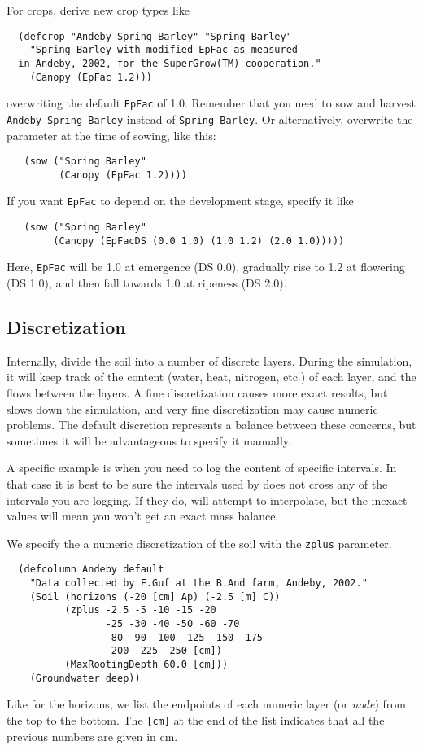 \documentclass[a4paper,11pt]{article}
\begin{document}
For crops, derive new crop types like
\begin{verbatim}
  (defcrop "Andeby Spring Barley" "Spring Barley"
    "Spring Barley with modified EpFac as measured
  in Andeby, 2002, for the SuperGrow(TM) cooperation."
    (Canopy (EpFac 1.2)))
\end{verbatim}
overwriting the default \texttt{EpFac} of 1.0.  Remember that you need
to sow and harvest \texttt{Andeby Spring Barley} instead of
\texttt{Spring Barley}.  Or alternatively, overwrite the parameter at
the time of sowing, like this:
\begin{verbatim}
   (sow ("Spring Barley"
         (Canopy (EpFac 1.2))))
\end{verbatim}
If you want \texttt{EpFac} to depend on the development stage, specify
it like
\begin{verbatim}
   (sow ("Spring Barley"
        (Canopy (EpFacDS (0.0 1.0) (1.0 1.2) (2.0 1.0)))))
\end{verbatim}
Here, \texttt{EpFac} will be 1.0 at emergence (DS 0.0), gradually rise
to 1.2 at flowering (DS 1.0), and then fall towards 1.0 at ripeness (DS
2.0).

\subsection{Discretization}

Internally, \daisy{} divide the soil into a number of discrete layers.
During the simulation, it will keep track of the content (water, heat,
nitrogen, etc.) of each layer, and the flows between the layers.  A
fine discretization causes more exact results, but slows down the
simulation, and very fine discretization may cause numeric problems.
The default discretion represents a balance between these concerns,
but sometimes it will be advantageous to specify it manually.

A specific example is when you need to log the content of specific
intervals.  In that case it is best to be sure the intervals used by
\daisy{} does not cross any of the intervals you are logging.  If they
do, \daisy{} will attempt to interpolate, but the inexact values will
mean you won't get an exact mass balance.

We specify the a numeric discretization of the soil with the
\texttt{zplus} parameter.  
\begin{verbatim}
  (defcolumn Andeby default
    "Data collected by F.Guf at the B.And farm, Andeby, 2002."
    (Soil (horizons (-20 [cm] Ap) (-2.5 [m] C))
          (zplus -2.5 -5 -10 -15 -20
                 -25 -30 -40 -50 -60 -70
                 -80 -90 -100 -125 -150 -175
                 -200 -225 -250 [cm])
          (MaxRootingDepth 60.0 [cm]))
    (Groundwater deep))
\end{verbatim}
Like for the horizons, we list the endpoints of each numeric layer (or
\emph{node}) from the top to the bottom.  The \verb|[cm]| at the end
of the list indicates that all the previous numbers are given in cm.
\end{document}
